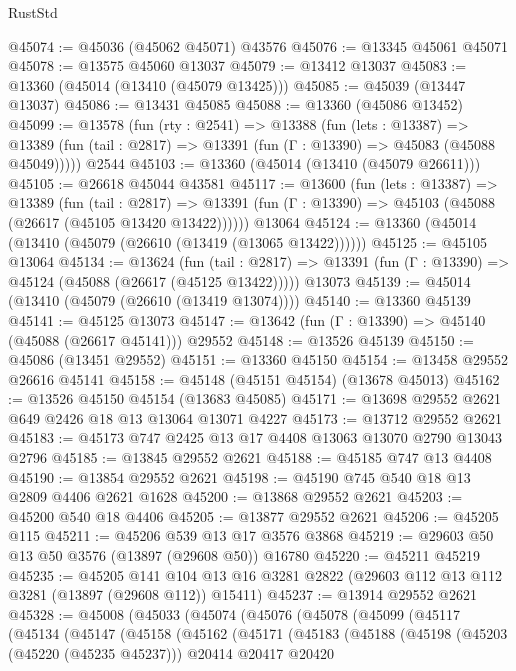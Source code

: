 \begin{lexlean}{RustStd}
\begin{coremodule}
@45074 := @45036 (@45062 @45071) @43576
@45076 := @13345 @45061 @45071
@45078 := @13575 @45060 @13037
@45079 := @13412 @13037
@45083 := @13360 (@45014 (@13410 (@45079 @13425)))
@45085 := @45039 (@13447 @13037)
@45086 := @13431 @45085
@45088 := @13360 (@45086 @13452)
@45099 := @13578
    (fun (rty : @2541) =>
    @13388
      (fun (lets : @13387) =>
      @13389 (fun (tail : @2817) => @13391 (fun (Γ : @13390) => @45083 (@45088 @45049)))))
    @2544
@45103 := @13360 (@45014 (@13410 (@45079 @26611)))
@45105 := @26618 @45044 @43581
@45117 := @13600
    (fun (lets : @13387) =>
    @13389
      (fun (tail : @2817) =>
      @13391 (fun (Γ : @13390) => @45103 (@45088 (@26617 (@45105 @13420 @13422))))))
    @13064
@45124 := @13360 (@45014 (@13410 (@45079 (@26610 (@13419 (@13065 @13422))))))
@45125 := @45105 @13064
@45134 := @13624
    (fun (tail : @2817) => @13391 (fun (Γ : @13390) => @45124 (@45088 (@26617 (@45125 @13422)))))
    @13073
@45139 := @45014 (@13410 (@45079 (@26610 (@13419 @13074))))
@45140 := @13360 @45139
@45141 := @45125 @13073
@45147 := @13642 (fun (Γ : @13390) => @45140 (@45088 (@26617 @45141))) @29552
@45148 := @13526 @45139
@45150 := @45086 (@13451 @29552)
@45151 := @13360 @45150
@45154 := @13458 @29552 @26616 @45141
@45158 := @45148 (@45151 @45154) (@13678 @45013)
@45162 := @13526 @45150 @45154 (@13683 @45085)
@45171 := @13698 @29552 @2621 @649 @2426 @18 @13 @13064 @13071 @4227
@45173 := @13712 @29552 @2621
@45183 := @45173 @747 @2425 @13 @17 @4408 @13063 @13070 @2790 @13043 @2796
@45185 := @13845 @29552 @2621
@45188 := @45185 @747 @13 @4408
@45190 := @13854 @29552 @2621
@45198 := @45190 @745 @540 @18 @13 @2809 @4406 @2621 @1628
@45200 := @13868 @29552 @2621
@45203 := @45200 @540 @18 @4406
@45205 := @13877 @29552 @2621
@45206 := @45205 @115
@45211 := @45206 @539 @13 @17 @3576 @3868
@45219 := @29603 @50 @13 @50 @3576 (@13897 (@29608 @50)) @16780
@45220 := @45211 @45219
@45235 := @45205
    @141
    @104
    @13
    @16
    @3281
    @2822
    (@29603 @112 @13 @112 @3281 (@13897 (@29608 @112)) @15411)
@45237 := @13914 @29552 @2621
@45328 := @45008
    (@45033
      (@45074
        (@45076
          (@45078
            (@45099
              (@45117
                (@45134
                  (@45147
                    (@45158
                      (@45162
                        (@45171
                          (@45183
                            (@45188
                              (@45198
                                (@45203 (@45220 (@45235 @45237)))
                                @20414
                                @20417
                                @20420

\end{coremodule}
\end{lexlean}
